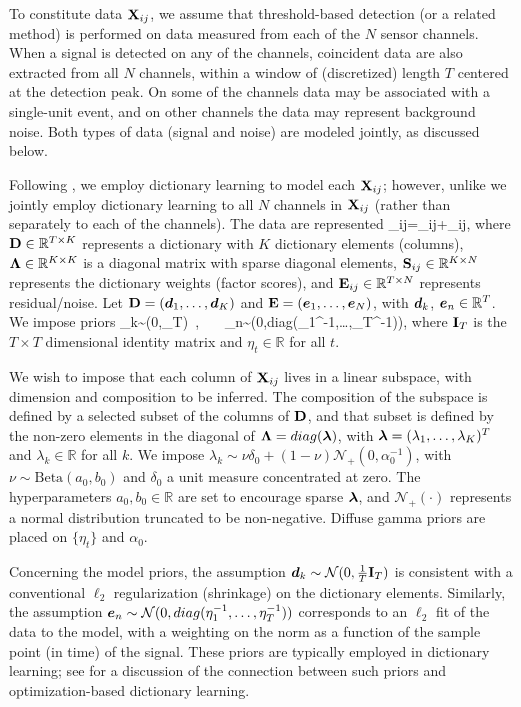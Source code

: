 \documentclass[journal]{IEEEtran}
\newcommand{\Real}{\mathbb{R}}
\begin{document}
To constitute data ${\mathbf X}_{ij}$, {we assume} that threshold-based detection (or a related method) is performed on data measured from each of the $N$ sensor channels. When a signal is detected on any of the channels, coincident data are also extracted from all $N$ channels, within a window of (discretized) length $T$ {centered at the detection peak}. On some of the channels data may be associated with a single-unit event, and on other channels the data may represent background noise. Both types of data (signal and noise) are modeled jointly, as discussed below.

Following \cite{Bo2011}, we employ dictionary learning to model each ${\mathbf X}_{ij}$; however, unlike \cite{Bo2011} we jointly employ dictionary learning to all $N$ channels in ${\mathbf X}_{ij}$ (rather than separately to each of the channels). The data are represented
\beq\Xmat_{ij}=\Dmat \Lambdamat \Smat_{ij}+\Emat_{ij},\label{eq:basic}\eeq
where ${\mathbf D}\in\mathbb{R}^{T\times K}$ represents a dictionary with $K$ dictionary elements (columns), $\boldsymbol{\Lambda}\in\mathbb{R}^{K\times K}$ is a diagonal matrix with sparse diagonal elements, ${\mathbf S}_{ij}\in\mathbb{R}^{K\times N}$ represents the dictionary weights (factor scores), and ${\mathbf E}_{ij}\in\mathbb{R}^{T\times N}$ represents residual/noise. Let ${\mathbf D}=(\boldsymbol{d}_1,\dots,\boldsymbol{d}_K)$ and ${\mathbf E}=(\boldsymbol{e}_1,\dots,\boldsymbol{e}_N)$, with {$\boldsymbol{d}_k$, $\boldsymbol{e}_n\in\mathbb{R}^T$}. We impose priors
\beq \dv_k\sim{}(0,\Imat_T)~,~~~ \ev_n\sim{}(0,\mbox{diag}(\eta_1^{-1},\dots,\eta_T^{-1})),\eeq
where ${\mathbf I}_T$ is the $T\times T$ dimensional identity matrix {and $\eta_t \in \Real$ for all $t$}.

We wish to impose that each column of ${\mathbf X}_{ij}$ lives in a linear subspace, with dimension and composition to be inferred. The composition of the subspace is defined by a selected subset of the columns of ${\mathbf D}$, and that subset is defined by the non-zero elements in the diagonal of $\boldsymbol{\Lambda}=\relax{diag}(\boldsymbol{\lambda})$, with $\boldsymbol{\lambda}=(\lambda_1,\dots,\lambda_K)^T$ {and $\lambda_k \in \Real$ for all $k$}. We impose $\lambda_k\sim\nu\delta_0+(1-\nu)\mathcal{N}_+(0,\alpha_0^{-1})$, with $\nu\sim\mbox{Beta}(a_0,b_0)$ and $\delta_0$ a unit measure concentrated at zero. The hyperparameters {$a_0,b_0 \in \Real$} are set to encourage sparse $\boldsymbol{\lambda}$, and $\mathcal{N}_+(\cdot)$ represents a normal distribution truncated to be non-negative. Diffuse gamma priors are placed on $\{\eta_t\}$ and $\alpha_0$.

Concerning the model priors, the assumption $\boldsymbol{d}_k\sim\mathcal{N}(0,\frac{1}{T}{\mathbf I}_T)$ is consistent with a conventional $\ell_2$ regularization ({shrinkage})
 on the dictionary elements. Similarly, the assumption $\boldsymbol{e}_n\sim\mathcal{N}(0,\relax{diag}(\eta_1^{-1},\dots,\eta_T^{-1}))$ corresponds to an $\ell_2$ fit of the data to the model, with a weighting on the norm as a function of the sample point (in time) of the signal. These priors are typically employed in dictionary learning; see \cite{Zhou12} for a discussion of the connection between such priors and optimization-based dictionary learning.
\end{document}
